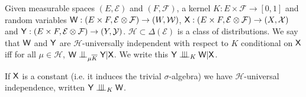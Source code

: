 \begin{definition}\label{def:univ_indep}
Given measurable spaces $(E,\mathcal{E})$ and $(F,\mathcal{F})$, a kernel $K:E\times\mathcal{F}\to[0,1]$ and random variables $\mathsf{W}:(E\times F,\mathcal{E}\otimes\mathcal{F})\to (W,\mathcal{W})$, $\mathsf{X}:(E\times F,\mathcal{E}\otimes\mathcal{F})\to (X,\mathcal{X})$ and $\mathsf{Y}:(E\times F,\mathcal{E}\otimes \mathcal{F})\to (Y,\mathcal{Y})$. $\mathscr{H}\subset\Delta(\mathcal{E})$ is a class of distributions. We say that $\mathsf{W}$ and $\mathsf{Y}$ are $\mathscr{H}$-universally independent with respect to $K$ conditional on $\mathsf{X}$ iff for all $\mu\in \mathscr{H}$, $\RV{W}\CI_{\mu \overline{K}} \RV{Y} |\RV{X}$. We write this $\RV{Y} \CII_K \RV{W} | \RV{X}$. 

If $\mathsf{X}$ is a constant (i.e. it induces the trivial $\sigma$-algebra) we have $\mathscr{H}$-universal independence, written $\RV{Y}\CII_K \RV{W}$.
\end{definition}